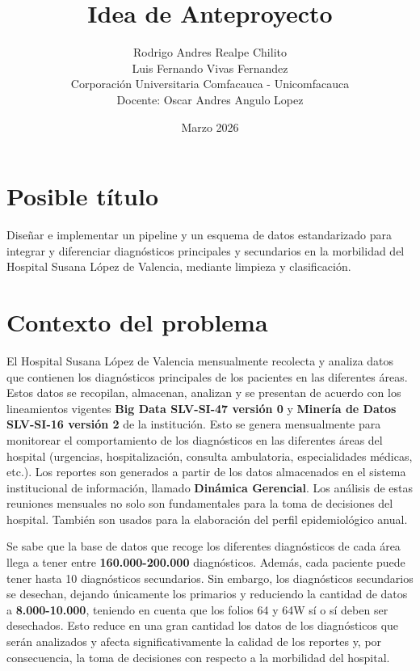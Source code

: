 \documentclass[12pt]{article}
\title{Idea de Anteproyecto}
\author{
Rodrigo Andres Realpe Chilito \\
Luis Fernando Vivas Fernandez \\
Corporación Universitaria Comfacauca - Unicomfacauca \\
Docente: Oscar Andres Angulo Lopez
}
\date{Marzo 2026}
\begin{document}
\maketitle

\newpage

\section*{Posible título}

Diseñar e implementar un pipeline y un esquema de datos estandarizado para integrar y diferenciar diagnósticos principales y secundarios en la morbilidad del Hospital Susana López de Valencia, mediante limpieza y clasificación.

\section*{Contexto del problema}

El Hospital Susana López de Valencia mensualmente recolecta y analiza datos que contienen los diagnósticos principales de los pacientes en las diferentes áreas. Estos datos se recopilan, almacenan, analizan y se presentan de acuerdo con los lineamientos vigentes \textbf{Big Data SLV-SI-47 versión 0} y \textbf{Minería de Datos SLV-SI-16 versión 2} de la institución. Esto se genera mensualmente para monitorear el comportamiento de los diagnósticos en las diferentes áreas del hospital (urgencias, hospitalización, consulta ambulatoria, especialidades médicas, etc.). Los reportes son generados a partir de los datos almacenados en el sistema institucional de información, llamado \textbf{Dinámica Gerencial}. Los análisis de estas reuniones mensuales no solo son fundamentales para la toma de decisiones del hospital. También son usados para la elaboración del perfil epidemiológico anual.

Se sabe que la base de datos que recoge los diferentes diagnósticos de cada área llega a tener entre \textbf{160.000-200.000} diagnósticos. Además, cada paciente puede tener hasta 10 diagnósticos secundarios. Sin embargo, los diagnósticos secundarios se desechan, dejando únicamente los primarios y reduciendo la cantidad de datos a \textbf{8.000-10.000}, teniendo en cuenta que los folios 64 y 64W sí o sí deben ser desechados. Esto reduce en una gran cantidad los datos de los diagnósticos que serán analizados y afecta significativamente la calidad de los reportes y, por consecuencia, la toma de decisiones con respecto a la morbilidad del hospital.
\end{document}
